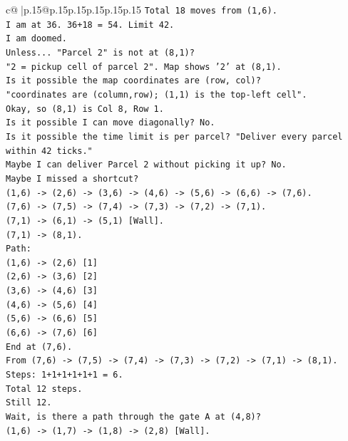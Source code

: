 \documentclass{article}
\begin{document}
{\begin{supertabular}{c@{$\;$}|p{.15\linewidth}@{}p{.15\linewidth}p{.15\linewidth}p{.15\linewidth}p{.15\linewidth}p{.15\linewidth}}
{{{\texttt{Total 18 moves from (1,6).} \\
\texttt{I am at 36. 36+18 = 54. Limit 42.} \\
\texttt{I am doomed.} \\
\texttt{Unless... "Parcel 2" is not at (8,1)?} \\
\texttt{"2 = pickup cell of parcel 2". Map shows '2' at (8,1).} \\
\texttt{Is it possible the map coordinates are (row, col)?} \\
\texttt{"coordinates are (column,row); (1,1) is the top{-}left cell".} \\
\texttt{Okay, so (8,1) is Col 8, Row 1.} \\
\texttt{Is it possible I can move diagonally? No.} \\
\texttt{Is it possible the time limit is per parcel? "Deliver every parcel within 42 ticks."} \\
\texttt{Maybe I can deliver Parcel 2 without picking it up? No.} \\
\texttt{Maybe I missed a shortcut?} \\
\texttt{(1,6) {-}> (2,6) {-}> (3,6) {-}> (4,6) {-}> (5,6) {-}> (6,6) {-}> (7,6).} \\
\texttt{(7,6) {-}> (7,5) {-}> (7,4) {-}> (7,3) {-}> (7,2) {-}> (7,1).} \\
\texttt{(7,1) {-}> (6,1) {-}> (5,1) {[}Wall{]}.} \\
\texttt{(7,1) {-}> (8,1).} \\
\texttt{Path:} \\
\texttt{(1,6) {-}> (2,6) {[}1{]}} \\
\texttt{(2,6) {-}> (3,6) {[}2{]}} \\
\texttt{(3,6) {-}> (4,6) {[}3{]}} \\
\texttt{(4,6) {-}> (5,6) {[}4{]}} \\
\texttt{(5,6) {-}> (6,6) {[}5{]}} \\
\texttt{(6,6) {-}> (7,6) {[}6{]}} \\
\texttt{End at (7,6).} \\
\texttt{From (7,6) {-}> (7,5) {-}> (7,4) {-}> (7,3) {-}> (7,2) {-}> (7,1) {-}> (8,1).} \\
\texttt{Steps: 1+1+1+1+1+1 = 6.} \\
\texttt{Total 12 steps.} \\
\texttt{Still 12.} \\
\texttt{Wait, is there a path through the gate A at (4,8)?} \\
\texttt{(1,6) {-}> (1,7) {-}> (1,8) {-}> (2,8) {[}Wall{]}.} \\
}}}
\end{supertabular}}
\end{document}
